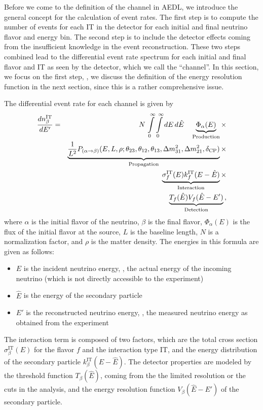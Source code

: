 Before we come to the definition of the channel in AEDL, we introduce the general concept for the calculation of event rates. The first step is to
compute the number of events for each IT in the detector for each 
initial and final neutrino flavor and energy bin. The second step is to include the detector effects coming from the insufficient knowledge in the event reconstruction. These two steps combined lead to the differential event rate spectrum for each initial and final flavor and IT as seen by the detector, which we call the ``channel''. In this section, we focus on the
 first step, \ie , we discuss the definition of the energy resolution function in the next section, since this is a rather comprehensive issue.

The differential event rate for each channel is given by
\begin{eqnarray}
\label{eq:master_event}
\frac{dn_{\beta}^{\text{IT}}}{dE'}=&&N\,\int\limits_0^\infty \int\limits_0^\infty dE\,d\hat{E}\quad
\underbrace{\Phi_{\alpha} (E)}_{\mathrm{Production}} \times \nonumber\\
&&\underbrace{\frac{1}{L^2} P_{(\alpha\rightarrow\beta)}(E,L,\rho;\theta_{23},
\theta_{12},\theta_{13},
\Delta m^2_{31},\Delta m^2_{21},\delta_{\mathrm{CP}})}_{\mathrm{Propagation}}
\times \nonumber \\ &&\underbrace{\sigma^{\text{IT}}_f(E)
k_f^{\text{IT}}(E-\hat{E})}_{\mathrm{Interaction}} \times \nonumber \\
&&\underbrace{ T_f(\hat{E}) V_f(\hat{E}-E')}_{\mathrm{Detection}}\,,
\end{eqnarray}
where $\alpha$ is the initial flavor of the neutrino, 
$\beta$ is the final flavor, $\Phi_{\alpha} (E)$ is the flux of the 
initial flavor at the
source, $L$ is the baseline length, $N$ is a normalization factor, and 
$\rho$ is the matter density. The energies in this formula are given as follows:
\begin{itemize}
\item
 $E$ is the incident neutrino energy, \ie, the actual energy of the 
incoming neutrino (which is not directly accessible to the experiment)
\item
 $\hat{E}$ is the energy of the secondary particle
\item
 $E'$ is the reconstructed neutrino energy, \ie, the measured
neutrino energy as obtained from the experiment
\end{itemize}
The interaction term is composed of 
two factors, which are the total cross section 
$\sigma^{\text{IT}}_\beta(E)$ for the flavor $f$ and
the interaction type IT, and the energy distribution of the 
secondary particle $k_\beta^{\text{IT}}(E-\hat{E})$.
The detector properties are 
modeled by the threshold function $T_\beta(\hat{E})$, coming from the the 
limited resolution or the cuts in the analysis, and the energy resolution 
function $V_\beta(\hat{E}-E')$ of the secondary particle. 

